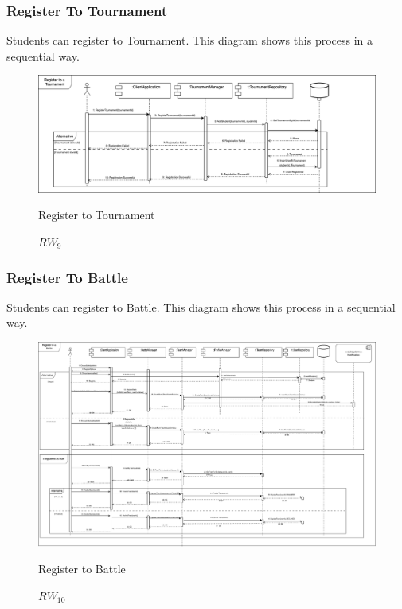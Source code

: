 \subsubsection{Register To Tournament}
Students can register to Tournament. This diagram shows this process in a sequential way.
\begin{figure}[H]
    \centering
    \includegraphics[width=\linewidth]{Images/runtime/register_tournament_runtime.drawio.png}
    \caption{$RW_{9}$} Register to Tournament
\end{figure}


\subsubsection{Register To Battle}
Students can register to Battle. This diagram shows this process in a sequential way.
\begin{figure}[H]
    \centering
    \includegraphics[width=\linewidth]{Images/runtime/register_battle_runtime.drawio.png}
    \caption{$RW_{10}$} Register to Battle
\end{figure}

